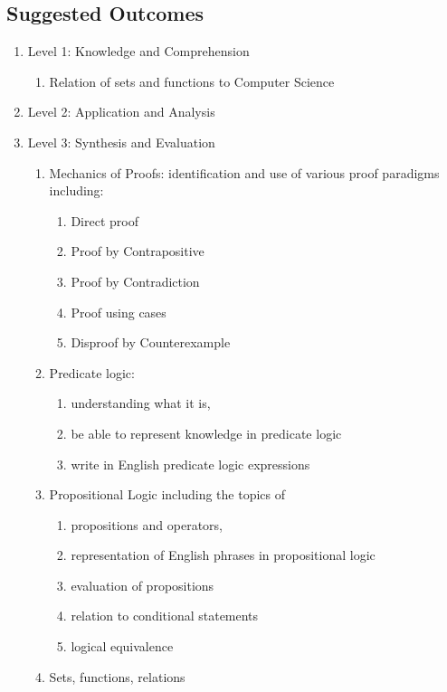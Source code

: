 \documentclass[11pt]{article}
\begin{document}
\begin{appendix}
\section{Suggested Outcomes}
\label{app:newOutcomes}
\begin{enumerate}
\item Level 1: Knowledge and Comprehension 
	\begin{enumerate}
	\item Relation of sets and functions to Computer Science
	\end{enumerate}
\item Level 2: Application and Analysis 
\item Level 3: Synthesis and Evaluation 
	\begin{enumerate}
        \item	Mechanics of Proofs: identification and use of various proof paradigms including:
               \begin{enumerate}
                \item	Direct proof
                \item	Proof by Contrapositive
                \item	Proof by Contradiction
                \item	Proof using cases
                \item	Disproof by Counterexample
        		\end{enumerate}
        \item	Predicate logic: 
                \begin{enumerate}
                \item	understanding what it is, 
                \item	be able to represent knowledge in predicate logic
                \item	write in English predicate logic expressions 
       		\end{enumerate}
        \item	Propositional Logic including the topics of 
                \begin{enumerate}
                \item	propositions and operators,
                \item	representation of English phrases in propositional logic
                \item	evaluation of propositions
                \item	relation to conditional statements 
                \item	logical equivalence 
        		\end{enumerate}
        \item	Sets, functions, relations 
	\end{enumerate}
\end{enumerate}


\end{appendix}
\end{document}
